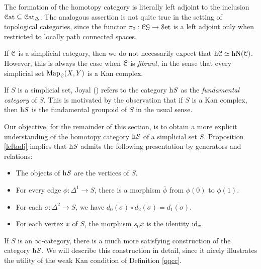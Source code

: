 \begin{1.2.3 The homotopy category}
\begin{remark}
The formation of the homotopy category is literally left adjoint to
the inclusion $\operatorname{\mathcal{C}at} \subseteq \operatorname{\mathcal{C}at_{\Delta}}$. The analogous assertion is not
quite true in the setting of topological categories, since the
functor $\pi_0: \operatorname{\mathcal{C}\mathcal{G}} \rightarrow \operatorname{\mathcal{S}et}$ is a left adjoint only when
restricted to locally path connected spaces.
\end{remark}

\begin{warning}
If $\operatorname{\mathcal{C}}$ is a simplicial category, then we do not necessarily
expect that $\rm{h} \it{\operatorname{\mathcal{C}}} \simeq \rm{h} \it{\operatorname{N}(\operatorname{\mathcal{C}})}$. However, this is always
the case when $\operatorname{\mathcal{C}}$ is {\it fibrant}, in the sense that every
simplicial set $\operatorname{{Map}}_{\operatorname{\mathcal{C}}}(X,Y)$ is a Kan complex.
\end{warning}

\begin{remark}
If $S$ is a simplicial set, Joyal (\cite{joyalnotpub}) refers to the category $\rm{h} \it{S}$ as the {\it fundamental
category} of $S$. This is motivated by the observation that if $S$ is a Kan complex, then $\rm{h} \it{S}$ is
the fundamental groupoid of $S$ in the usual sense.
\end{remark}

Our objective, for the remainder of this section, is to obtain a more explicit understanding of
the homotopy category $\rm{h} \it{S}$ of a simplicial set $S$. Proposition \ref{leftadj} implies that $\rm{h} \it{S}$ 
admits the following presentation by generators and relations:

\begin{itemize}
\item The objects of $\rm{h} \it{S}$ are the vertices of $S$.

\item For every edge $\phi: \Delta^1 \rightarrow S$, there is a morphism $\overline{\phi}$ from
$\phi(0)$ to $\phi(1)$.

\item For each $\sigma: \Delta^2 \rightarrow S$, we have $\overline{d_0(\sigma)} \circ \overline{d_2(\sigma)} = \overline{d_1(\sigma)}$.

\item For each vertex $x$ of $S$, the morphism $\overline{s_0 x}$ is the identity $\operatorname{id}_x$. 
\end{itemize}

If $S$ is an $\infty$-category, there is a much more satisfying construction of the category $\rm{h} \it{S}$.
We will describe this construction in detail, since it nicely illustrates the utility of the weak Kan condition of Definition \ref{qqcc}.


\end{1.2.3 The homotopy category}
